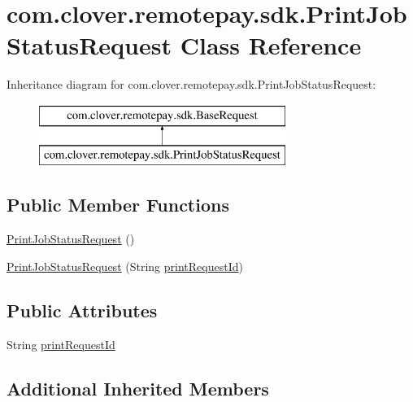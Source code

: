 \hypertarget{classcom_1_1clover_1_1remotepay_1_1sdk_1_1_print_job_status_request}{}\section{com.\+clover.\+remotepay.\+sdk.\+Print\+Job\+Status\+Request Class Reference}
\label{classcom_1_1clover_1_1remotepay_1_1sdk_1_1_print_job_status_request}
Inheritance diagram for com.\+clover.\+remotepay.\+sdk.\+Print\+Job\+Status\+Request\+:\begin{figure}[H]
\begin{center}
\leavevmode
\includegraphics[height=2.000000cm]{classcom_1_1clover_1_1remotepay_1_1sdk_1_1_print_job_status_request}
\end{center}
\end{figure}
\subsection*{Public Member Functions}
\begin{DoxyCompactItemize}
\item 
\hyperlink{classcom_1_1clover_1_1remotepay_1_1sdk_1_1_print_job_status_request_a3f02ef4e674c196ec8f4a6e3f9cbceb7}{Print\+Job\+Status\+Request} ()
\item 
\hyperlink{classcom_1_1clover_1_1remotepay_1_1sdk_1_1_print_job_status_request_a270764996e1fb3f9b38effd2d0d750ba}{Print\+Job\+Status\+Request} (String \hyperlink{classcom_1_1clover_1_1remotepay_1_1sdk_1_1_print_job_status_request_ae4588c40cf7d2584db90a3c0dc615650}{print\+Request\+Id})
\end{DoxyCompactItemize}
\subsection*{Public Attributes}
\begin{DoxyCompactItemize}
\item 
String \hyperlink{classcom_1_1clover_1_1remotepay_1_1sdk_1_1_print_job_status_request_ae4588c40cf7d2584db90a3c0dc615650}{print\+Request\+Id}
\end{DoxyCompactItemize}
\subsection*{Additional Inherited Members}


